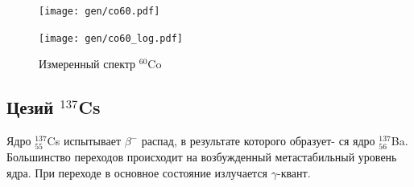 \documentclass[12pt,a4paper]{article}
\begin{document}
	
	\begin{figure}[H]
		\centering
		\begin{minipage}{0.5\textwidth}
			\centering
			\texttt{[image: gen/co60.pdf]}
		\end{minipage}%
		\begin{minipage}{0.5\textwidth}
			\centering
			\texttt{[image: gen/co60\_log.pdf]}
		\end{minipage}
		\caption{Измеренный спектр $^{60}$Co}
		\label{fig:co_spectrum}
	\end{figure}
		
	\subsection*{Цезий $^{137}$Cs}
	
	
	Ядро $^{137}_{55}$Cs испытывает $\beta^{-}$ распад, в результате которого образует-
	ся ядро $^{137}_{56}$Ba. Большинство переходов происходит на возбужденный метастабильный уровень ядра. При переходе в основное состояние излучается $\gamma$-квант.
	
\end{document}
